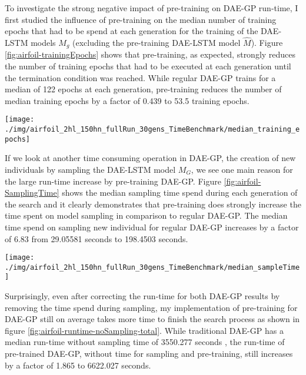 \documentclass[
  11pt,
]{article}
\let\origfigure\figure
\let\endorigfigure\endfigure
\renewenvironment{figure}[1][2] {
    \expandafter\origfigure\expandafter[H]
} {
    \endorigfigure
}
\begin{document}
To investigate the strong negative impact of pre-training on DAE-GP run-time, I first studied the influence of pre-training on the median number of training epochs that had to be spend at each generation for the training of the DAE-LSTM models \(M_g\) (excluding the pre-training DAE-LSTM model \(\hat{M}\)). Figure \ref{fig:airfoil-trainingEpochs} shows that pre-training, as expected, strongly reduces the number of training epochs that had to be executed at each generation until the termination condition was reached. While regular DAE-GP trains for a median of 122 epochs at each generation, pre-training reduces the number of median training epochs by a factor of 0.439 to 53.5 training epochs.

\begin{figure}[c]

{\centering \texttt{[image: ./img/airfoil\_2hl\_150hn\_fullRun\_30gens\_TimeBenchmark/median\_training\_epochs]} 

}

\caption{Median Number of Training Epochs per Generation - Airfoil}\label{fig:airfoil-trainingEpochs}
\end{figure}

If we look at another time consuming operation in DAE-GP, the creation of new individuals by sampling the DAE-LSTM model \(M_G\), we see one main reason for the large run-time increase by pre-training DAE-GP. Figure \ref{fig:airfoil-SamplingTime} shows the median sampling time spend during each generation of the search and it clearly demonstrates that pre-training does strongly increase the time spent on model sampling in comparison to regular DAE-GP. The median time spend on sampling new individual for regular DAE-GP increases by a factor of 6.83 from 29.05581 seconds to 198.4503 seconds.

\begin{figure}[c]

{\centering \texttt{[image: ./img/airfoil\_2hl\_150hn\_fullRun\_30gens\_TimeBenchmark/median\_sampleTime]} 

}

\caption{Median Sampling Time per Generation - Airfoil}\label{fig:airfoil-SamplingTime}
\end{figure}

Surprisingly, even after correcting the run-time for both DAE-GP results by removing the time spend during sampling, my implementation of pre-training for DAE-GP still on average takes more time to finish the search process as shown in figure \ref{fig:airfoil-runtime-noSampling-total}. While traditional DAE-GP has a median run-time without sampling time of 3550.277 seconds , the run-time of pre-trained DAE-GP, without time for sampling and pre-training, still increases by a factor of 1.865 to 6622.027 seconds.
\end{document}
